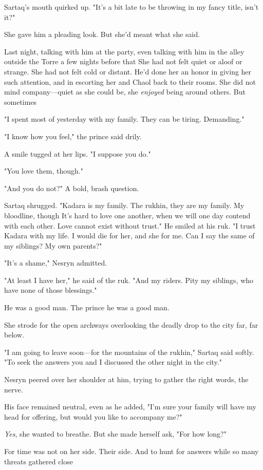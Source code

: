 Sartaq's mouth quirked up. "It's a bit late to be throwing in my fancy title, isn't it?"

She gave him a pleading look. But she'd meant what she said.

Last night, talking with him at the party, even talking with him in the alley outside the Torre a few nights before that  She had not felt quiet or aloof or strange. She had not felt cold or distant. He'd done her an honor in giving her such attention, and in escorting her and Chaol back to their rooms. She did not mind company---quiet as she could be, she \emph{enjoyed} being around others. But sometimes 

"I spent most of yesterday with my family. They can be  tiring. Demanding."

"I know how you feel," the prince said drily.

A smile tugged at her lips. "I suppose you do."

"You love them, though."

"And you do not?" A bold, brash question.

Sartaq shrugged. "Kadara is my family. The rukhin, they are my family. My bloodline, though  It's hard to love one another, when we will one day contend with each other. Love cannot exist without trust." He smiled at his ruk. "I trust Kadara with my life. I would die for her, and she for me. Can I say the same of my siblings? My own parents?"

"It's a shame," Nesryn admitted.

"At least I have her," he said of the ruk. "And my riders. Pity my siblings, who have none of those blessings."

He was a good man. The prince  he was a good man.

She strode for the open archways overlooking the deadly drop to the city far, far below.

"I am going to leave soon---for the mountains of the rukhin," Sartaq said softly. "To seek the answers you and I discussed the other night in the city."

Nesryn peered over her shoulder at him, trying to gather the right words, the nerve.

His face remained neutral, even as he added, "I'm sure your family will have my head for offering, but  would you like to accompany me?"

\emph{Yes}, she wanted to breathe. But she made herself ask, "For how long?"

For time was not on her side. Their side. And to hunt for answers while so many threats gathered close 

